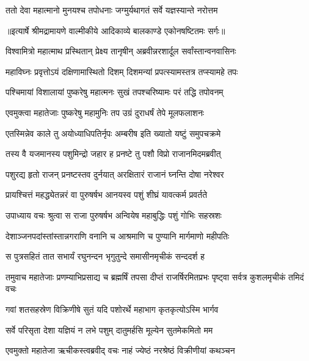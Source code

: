 \twolineshloka
{ततो देवा महात्मानो मुनयश्च तपोधनाः}
{जग्मुर्यथागतं सर्वे यज्ञस्यान्ते नरोत्तम} %


{॥इत्यार्षे श्रीमद्रामायणे वाल्मीकीये आदिकाव्ये बालकाण्डे एकोनषष्टितमः सर्गः॥}


\twolineshloka
{विश्वामित्रो महात्माथ प्रस्थितान् प्रेक्ष्य तानृषीन्}
{अब्रवीन्नरशार्दूल सर्वांस्तान्वनवासिनः} %

\twolineshloka
{महाविघ्नः प्रवृत्तोऽयं दक्षिणामास्थितो दिशम्}
{दिशमन्यां प्रपत्स्यामस्तत्र तप्स्यामहे तपः} %

\twolineshloka
{पश्चिमायां विशालायां पुष्करेषु महात्मनः}
{सुखं तपश्चरिष्यामः परं तद्धि तपोवनम्} %

\twolineshloka
{एवमुक्त्वा महातेजाः पुष्करेषु महामुनिः}
{तप उग्रं दुराधर्षं तेपे मूलफलाशनः} %

\twolineshloka
{एतस्मिन्नेव काले तु अयोध्याधिपतिर्नृपः}
{अम्बरीष इति ख्यातो यष्टुं समुपचक्रमे} %

\twolineshloka
{तस्य वै यजमानस्य पशुमिन्द्रो जहार ह}
{प्रनष्टे तु पशौ विप्रो राजानमिदमब्रवीत्} %

\twolineshloka
{पशुरद्य हृतो राजन् प्रनष्टस्तव दुर्नयात्}
{अरक्षितारं राजानं घ्नन्ति दोषा नरेश्वर} %

\twolineshloka
{प्रायश्चित्तं महद्ध्येतन्नरं वा पुरुषर्षभ}
{आनयस्व पशुं शीघ्रं यावत्कर्म प्रवर्तते} %

\twolineshloka
{उपाध्याय वचः श्रुत्वा स राजा पुरुषर्षभ}
{अन्वियेष महाबुद्धिः पशुं गोभिः सहस्रशः} %

\twolineshloka
{देशाञ्जनपदांस्तांस्तान्नगराणि वनानि च}
{आश्रमाणि च पुण्यानि मार्गमाणो महीपतिः} %

\twolineshloka
{स पुत्रसहितं तात सभार्यं रघुनन्दन}
{भृगुतुन्दे समासीनमृचीकं सन्ददर्श ह} %

\threelineshloka
{तमुवाच महातेजाः प्रणम्याभिप्रसाद्य च}
{ब्रह्मर्षिं तपसा दीप्तं राजर्षिरमितप्रभः}
{पृष्ट्वा सर्वत्र कुशलमृचीकं तमिदं वचः} %

\twolineshloka
{गवां शतसहस्रेण विक्रिणीषे सुतं यदि}
{पशोरर्थे महाभाग कृतकृत्योऽस्मि भार्गव} %

\twolineshloka
{सर्वे परिसृता देशा यज्ञियं न लभे पशुम्}
{दातुमर्हसि मूल्येन सुतमेकमितो मम} %

\twolineshloka
{एवमुक्तो महातेजा ऋचीकस्त्वब्रवीद् वचः}
{नाहं ज्येष्ठं नरश्रेष्ठं विक्रीणीयां कथञ्चन} %

